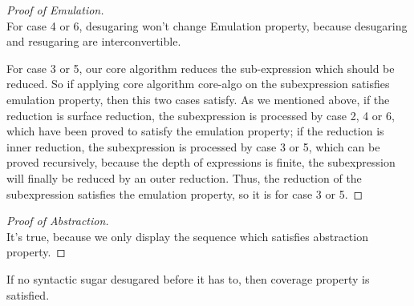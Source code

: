 \begin{proof}[Proof of Emulation]
\hfill\\
For case 4 or 6, desugaring won't change Emulation property, because desugaring and resugaring are interconvertible.

For case 3 or 5, our core algorithm reduces the sub-expression which should be reduced. So if applying core algorithm core-algo on the subexpression satisfies emulation property, then this two cases satisfy. As we mentioned above, if the reduction is surface reduction, the subexpression is processed by case 2, 4 or 6, which have been proved to satisfy the emulation property; if the reduction is inner reduction, the subexpression is processed by case 3 or 5, which can be proved recursively, because the depth of expressions is finite, the subexpression will finally be reduced by an outer reduction. Thus, the reduction of the subexpression satisfies the emulation property, so it is for case 3 or 5.
\end{proof}

\begin{proof}[Proof of Abstraction]
\hfill\\
It's true, because we only display the sequence which satisfies abstraction property.
\end{proof}

\begin{lemma}
If no syntactic sugar desugared before it has to, then coverage property is satisfied.
\end{lemma}

